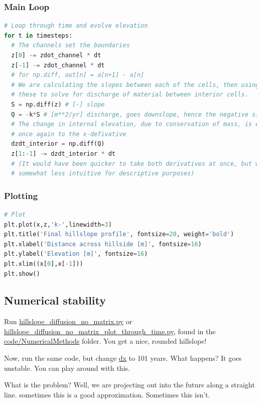 \documentclass[a4paper,10pt]{scrartcl}
\begin{document}
\subsubsection{Main Loop}

\begin{lstlisting}[language=Python]
# Loop through time and evolve elevation
for t in timesteps:
  # The channels set the boundaries
  z[0] -= zdot_channel * dt
  z[-1] -= zdot_channel * dt
  # for np.diff, out[n] = a[n+1] - a[n]
  # We are calculating the slopes between each of the cells, then using 
  # these to solve for discharge of material between interior cells.
  S = np.diff(z) # [-] slope
  Q = -k*S # [m**2/yr] discharge, goes downslope, hence the negative sign # POSITIVE - WHY? CANCELLED OUT AGAIN!
  # The change in internal elevation, due to conservation of mass, is equal 
  # once again to the x-defivative
  dzdt_interior = np.diff(Q)
  z[1:-1] -= dzdt_interior * dt
  # (It would have been quicker to take both derivatives at once, but would be 
  # somewhat less intuitive for descriptive purposes)
\end{lstlisting}

\subsubsection{Plotting}

\begin{lstlisting}[language=Python]
# Plot
plt.plot(x,z,'k-',linewidth=3)
plt.title('Final hillslope profile', fontsize=20, weight='bold')
plt.xlabel('Distance across hillside [m]', fontsize=16)
plt.ylabel('Elevation [m]', fontsize=16)
plt.xlim((x[0],x[-1]))
plt.show()
\end{lstlisting}

\subsection{Numerical stability}

Run \url{hillslope_diffusion_no_matrix.py} or \url{hillslope_diffusion_no_matrix_plot_through_time.py}, found in the \url{code/NumericalMethods} folder. You get a nice, rounded hillslope!

Now, run the same code, but change \url{dx} to 101 years. What happens? It goes unstable. You can play around with this.

What is the problem? Well, we are projecting out into the future along a straight line. sometimes this is a good approximation. Sometimes this isn't.
\end{document}
